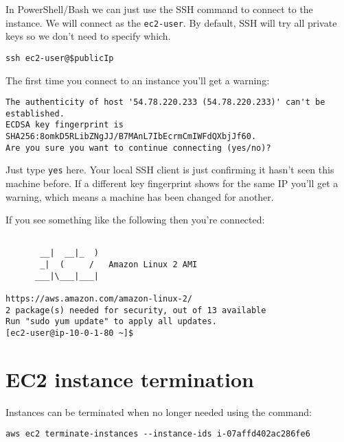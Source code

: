 \documentclass{pgnotes}
\begin{document}
In PowerShell/Bash we can just use the SSH command to connect to the instance.
We will connect as the \texttt{ec2-user}.
By default, SSH will try all private keys so we don't need to specify which.

\begin{verbatim}
ssh ec2-user@$publicIp 
\end{verbatim}

The first time you connect to an instance you'll get a warning:

\begin{verbatim}
The authenticity of host '54.78.220.233 (54.78.220.233)' can't be established.
ECDSA key fingerprint is SHA256:8omkD5RLibZNgJJ/B7MAnL7IbEcrmCmIWFdQXbjJf60.
Are you sure you want to continue connecting (yes/no)?
\end{verbatim}

Just type \texttt{yes} here.
Your local SSH client is just confirming it hasn't seen this machine before.
If a different key fingerprint shows for the same IP you'll get a warning, which means a machine has been changed for another.

If you see something like the following then you're connected:

\begin{verbatim}

       __|  __|_  )
       _|  (     /   Amazon Linux 2 AMI
      ___|\___|___|

https://aws.amazon.com/amazon-linux-2/
2 package(s) needed for security, out of 13 available
Run "sudo yum update" to apply all updates.
[ec2-user@ip-10-0-1-80 ~]$ 
\end{verbatim}

\section{EC2 instance termination}

Instances can be terminated when no longer needed using the command: 

\begin{verbatim}
aws ec2 terminate-instances --instance-ids i-07affd402ac286fe6
\end{verbatim}
\end{document}
